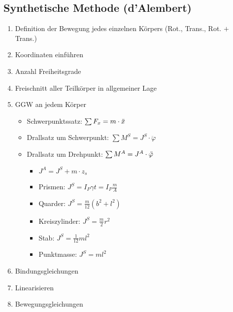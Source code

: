 \documentclass[fleqn,twoside]{article}
\begin{document}
\begin{multicols*}{3}
\subsection{Synthetische Methode (d'Alembert)}
\begin{enumerate}
    \item Definition der Bewegung jedes einzelnen Körpers (Rot., Trans., Rot. $+$ Trans.)
    \item Koordinaten einführen
    \item Anzahl Freiheitsgrade
    \item Freischnitt aller Teilkörper in allgemeiner Lage
    \item GGW an jedem Körper
        \begin{itemize}
            \item Schwerpunktssatz: $\sum F_x=m \cdot \Ddot{x}$
            \item Drallsatz um Schwerpunkt: $\sum M^S=J^S \cdot \ddot{\varphi}$
            \item Drallsatz um Drehpunkt: $\sum M^A=J^A \cdot \Ddot{\varphi}$
                \begin{itemize}
                    \item $J^A=J^S+m \cdot z_s$
                    \item Prismen: $J^S=I_P \gamma t=I_P \frac{m}{A}$
                    \item Quarder: $J^S=\frac{m}{12}\left(b^2+l^2\right)$
                    \item Kreiszylinder: $J^S=\frac{m}{2} r^2$
                    \item Stab: $J^S=\frac{1}{12} m l^2$
                    \item Punktmasse: $J^S=ml^2$
                \end{itemize}
        \end{itemize}
    \item Bindungsgleichungen
    \item Linearisieren
    \item Bewegungsgleichungen
\end{enumerate}


\end{multicols*}
\end{document}
